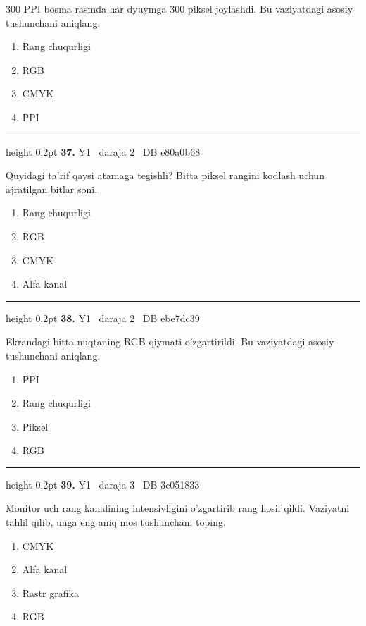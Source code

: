 \documentclass[10pt,a4paper,oneside]{article}
\begin{document}
300 PPI bosma rasmda har dyuymga 300 piksel joylashdi. Bu vaziyatdagi asosiy tushunchani aniqlang.
\begin{enumerate}[label=\Alph*),leftmargin=9mm]
\item Rang chuqurligi
\item RGB
\item CMYK
\item PPI
\end{enumerate}
\vspace{2mm}\hrule height 0.2pt \vspace{4mm}
\hypertarget{q37}{\textbf{\color{ink}37.}}  {\color{muted}\scriptsize Y1 \textbullet\ daraja 2 \textbullet\ DB e80a0b68}
\par
Quyidagi ta'rif qaysi atamaga tegishli? Bitta piksel rangini kodlash uchun ajratilgan bitlar soni.
\begin{enumerate}[label=\Alph*),leftmargin=9mm]
\item Rang chuqurligi
\item RGB
\item CMYK
\item Alfa kanal
\end{enumerate}
\vspace{2mm}\hrule height 0.2pt \vspace{4mm}
\hypertarget{q38}{\textbf{\color{ink}38.}}  {\color{muted}\scriptsize Y1 \textbullet\ daraja 2 \textbullet\ DB ebe7dc39}
\par
Ekrandagi bitta nuqtaning RGB qiymati o'zgartirildi. Bu vaziyatdagi asosiy tushunchani aniqlang.
\begin{enumerate}[label=\Alph*),leftmargin=9mm]
\item PPI
\item Rang chuqurligi
\item Piksel
\item RGB
\end{enumerate}
\vspace{2mm}\hrule height 0.2pt \vspace{4mm}
\hypertarget{q39}{\textbf{\color{ink}39.}}  {\color{muted}\scriptsize Y1 \textbullet\ daraja 3 \textbullet\ DB 3c051833}
\par
Monitor uch rang kanalining intensivligini o'zgartirib rang hosil qildi. Vaziyatni tahlil qilib, unga eng aniq mos tushunchani toping.
\begin{enumerate}[label=\Alph*),leftmargin=9mm]
\item CMYK
\item Alfa kanal
\item Rastr grafika
\item RGB
\end{enumerate}
\end{document}
